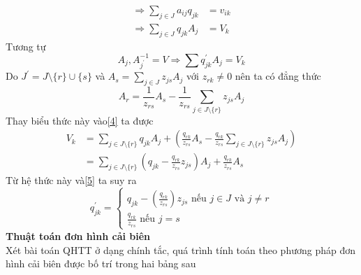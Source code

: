 \documentclass{article}
\begin{document}
\begin{enumerate}
\begin{equation}
\begin{split}
                                        \Rightarrow \sum_{j \in J}a_{ij}q_{jk}&=v_{ik} \\
                                        \Rightarrow \sum_{j \in J}q_{jk}A_j&=V_k
                                    \end{split}
                                \end{equation}
                            Tương tự
                            \begin{equation} \label{5}
                                A_j,A_{j^{'}}^{-1}=V \Rightarrow \sum q_{jk}^{'}A_j=V_k
                            \end{equation}  
                            Do $J^{'}=J \setminus \{r\} \cup \{s\}$ và $A_s=\sum_{j \in J}z_{js}A_j$ với $z_{rk}\neq 0$ nên ta có đẳng thức \\
                            \[A_r=\frac{1}{z_{rs}}A_s - \frac{1}{z_{rs}} \sum_{j \in J \setminus \{r\}}z_{js}A_j\]  
                            Thay biểu thức này vào\eqref{4} ta được
                                \begin{equation}
                                    \begin{split}
                                        V_k&=\sum_{j \in J \setminus \{r\}}q_{jk}A_j+(\frac{q_{rk}}{z_{rs}}A_s-\frac{q_{rk}}{z_{rs}}\sum_{j \in J \setminus \{r\}}z_{js}A_j) \\
                                        &=\sum_{j \in J \setminus \{r\}}(q_{jk}-\frac{q_{rk}}{z_{rs}}z_{js})A_j + \frac{q_{rk}}{z_{rs}}A_s
                                    \end{split}
                                \end{equation}
                            Từ hệ thức này và\eqref{5} ta suy ra
                            \begin{equation} \label{6da}
                                q_{jk}^{'}=
                                \begin{cases}
                                    q_{jk}-(\frac{q_{rk}}{z_{rs}})z_{js} \text{ nếu } j \in J \text{ và } j \neq r \\
                                    \frac{q_{rk}}{z_{rs}} \text{ nếu } j = s
                                \end{cases}
                            \end{equation}     
                        \textbf{Thuật toán đơn hình cải biên} \\
                        Xét bài toán QHTT ở dạng chính tắc, quá trình tính toán theo phương pháp đơn hình cải biên được bố trí trong hai bảng sau \\

\end{enumerate}
\end{document}
